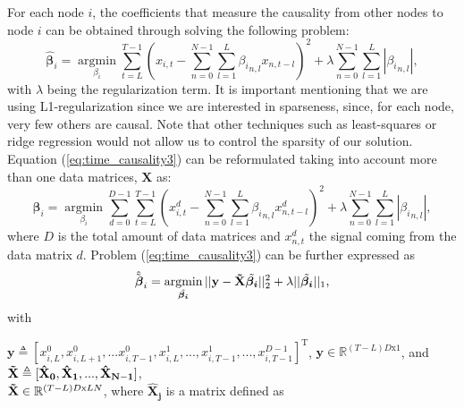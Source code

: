 \documentclass[10pt,conference,compsocconf]{IEEEtran}
\begin{document}
For each node ${i}$, the coefficients that measure the causality from other nodes to node ${i}$ can be obtained through solving the following problem:
\begin{equation}
{\hat{\boldsymbol\beta}_i}=\operatorname*{argmin}_{\beta_i} \sum_{t=L}^{T-1}(x_{i,t} -\sum_{n=0}^{N-1}\sum_{l=1}^{L}{{\beta_i}_{n,l}x_{n,t-l}})^2+\lambda{\sum_{n=0}^{N-1}\sum_{l=1}^{L}{|{\beta_i}_{n,l}|}},
\label{eq:time_causality3}
\end{equation}
with ${\lambda}$ being the regularization term. It is important mentioning that we are using L1-regularization since we are interested in sparseness, since, for each node, very few others are causal. Note that other techniques such as least-squares or ridge regression would not allow us to control the sparsity of our solution. Equation (\ref{eq:time_causality3}) can be reformulated taking into account more than one data matrices, $\mathbf{X}$ as:
\small
\begin{equation}
{\hat{\boldsymbol\beta}_i}=\operatorname*{argmin}_{\beta_i} \sum_{d=0}^{D-1}\sum_{t=L}^{T-1}(x_{i,t}^d -\sum_{n=0}^{N-1}\sum_{l=1}^{L}{{\beta_i}_{n,l}x_{n,t-l}^d})^2+\lambda{\sum_{n=0}^{N-1}\sum_{l=1}^{L}{|{\beta_i}_{n,l}|}},{}
\label{eq:time_causality4}
\end{equation}
\normalsize
where ${D}$ is the total amount of data matrices and ${x_{n,t}^d}$ the signal coming from the data matrix ${d}$. Problem (\ref{eq:time_causality3}) can be further expressed as
\begin{equation}
{\hat{\Tilde{\boldsymbol\beta}}_i}=\operatorname*{argmin}_{\Tilde{\boldsymbol{\beta_i}}} ||\mathbf{y}-\mathbf{\Tilde{X}}\Tilde{\boldsymbol{\beta_i}}||_2^2+\lambda{||\Tilde{\boldsymbol{\beta_i}}||_1},
\label{eq:time_causality5}
\end{equation}
with

$\mathbf{y}\triangleq[x^0_{i,L},x^0_{i,L+1},...x^0_{i,T-1},x^1_{i,L},...,x^1_{i,T-1},...,x^{D-1}_{i,T-1}]^\mathrm{T}$, $\mathbf{y}\in{\mathbb{R}^{(T-L)D\mathrm{x}1}}$, and $\mathbf{\Tilde{X}}\triangleq[\mathbf{\hat{X}_0},\mathbf{\hat{X}_1},...,\mathbf{\hat{X}_{N-1}}]$,  
\\
\noindent
$\mathbf{\Tilde{X}}\in{\mathbb{R}^{(T-L)D\mathrm{x}LN}}$, where  $\mathbf{\hat{X}_{j}}$ is a matrix defined as
\end{document}
